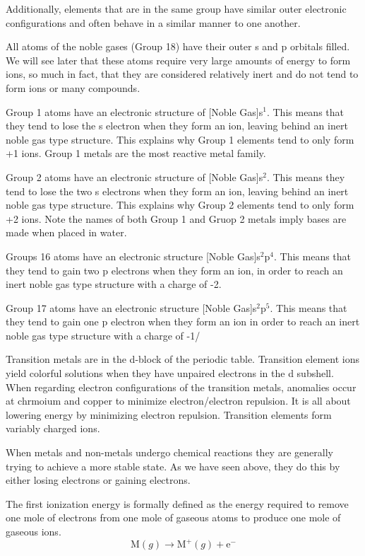 \documentclass[../chem.tex]{subfiles}
\begin{document}
Additionally, elements that are in the same group have similar outer electronic configurations and often behave in a similar manner to one another.

All atoms of the noble gases (Group 18) have their outer s and p orbitals filled. We will see later that these atoms require very large 
amounts of energy to form ions, so much in fact, that they are considered relatively inert and do not tend to form ions or many compounds. 

Group 1 atoms have an electronic structure of [Noble Gas]s$^1$. This means that they tend to lose the s electron when they form an ion, leaving behind an inert noble 
gas type structure. This explains why Group 1 elements tend to only form +1 ions. Group 1 metals are the most reactive metal family.

Group 2 atoms have an electronic structure of [Noble Gas]s$^2$. This means they tend to lose the two s electrons when they form an ion, leaving behind an inert noble gas type structure. This explains why 
Group 2 elements tend to only form +2 ions. Note the names of both Group 1 and Gruop 2 metals imply bases are made when placed in water.

Groups 16 atoms have an electronic structure [Noble Gas]s$^2$p$^4$. This means that they tend to gain two p electrons when they form an ion, 
in order to reach an inert noble gas type structure with a charge of -2.

Group 17 atoms have an electronic structure [Noble Gas]s$^2$p$^5$. This means that they tend to gain one p electron when they form an ion in order 
to reach an inert noble gas type structure with a charge of -1/

Transition metals are in the d-block of the periodic table. Transition element ions yield colorful solutions when they have unpaired 
electrons in the d subshell. When regarding electron configurations of the transition metals, anomalies occur at chrmoium and copper to minimize 
electron/electron repulsion. It is all about lowering energy by minimizing electron repulsion. Transition elements form variably charged ions.

When metals and non-metals undergo chemical reactions they are generally trying to achieve a more stable state. As we have seen above, they do this 
by either losing electrons or gaining electrons.

The first ionization energy is formally defined as the energy required to remove one mole of electrons from one mole of gaseous atoms to produce one mole of gaseous ions.
\[\text{M}(g)\rightarrow\text{M}^+(g)+\text{e}^-\] 
\end{document}
